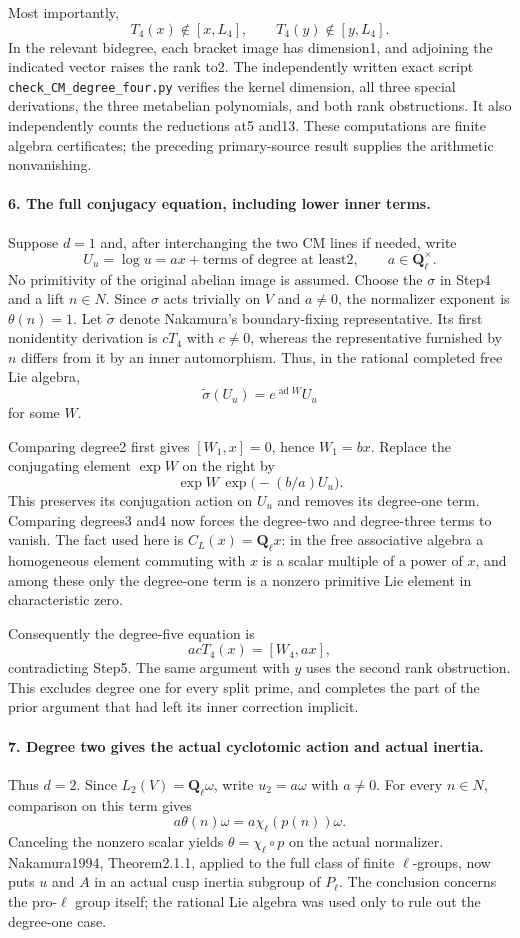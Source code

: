Most importantly,
\[
 T_4(x)\notin[x,L_4],\qquad T_4(y)\notin[y,L_4].
\]
In the relevant bidegree, each bracket image has dimension1, and adjoining the indicated vector raises the rank to2. The independently written exact script \texttt{check\_CM\_degree\_four.py} verifies the kernel dimension, all three special derivations, the three metabelian polynomials, and both rank obstructions. It also independently counts the reductions at5 and13. These computations are finite algebra certificates; the preceding primary-source result supplies the arithmetic nonvanishing.

\paragraph{6. The full conjugacy equation, including lower inner terms.}
Suppose $d=1$ and, after interchanging the two CM lines if needed, write
\[
 U_u=\log u=a x+\text{terms of degree at least2},\qquad a\in\mathbf Q_\ell^\times.
\]
No primitivity of the original abelian image is assumed. Choose the $\sigma$ in Step4 and a lift $n\in N$. Since $\sigma$ acts trivially on $V$ and $a\ne0$, the normalizer exponent is $\theta(n)=1$. Let $\widetilde\sigma$ denote Nakamura's boundary-fixing representative. Its first nonidentity derivation is $cT_4$ with $c\ne0$, whereas the representative furnished by $n$ differs from it by an inner automorphism. Thus, in the rational completed free Lie algebra,
\[
 \widetilde\sigma(U_u)=e^{\operatorname{ad} W}U_u
\]
for some $W$.

Comparing degree2 first gives $[W_1,x]=0$, hence $W_1=b x$. Replace the conjugating element $\exp W$ on the right by
\[
 \exp W\,\exp\bigl(-(b/a)U_u\bigr).
\]
This preserves its conjugation action on $U_u$ and removes its degree-one term. Comparing degrees3 and4 now forces the degree-two and degree-three terms to vanish. The fact used here is $C_L(x)=\mathbf Q_\ell x$: in the free associative algebra a homogeneous element commuting with $x$ is a scalar multiple of a power of $x$, and among these only the degree-one term is a nonzero primitive Lie element in characteristic zero.

Consequently the degree-five equation is
\[
 acT_4(x)=[W_4,a x],
\]
contradicting Step5. The same argument with $y$ uses the second rank obstruction. This excludes degree one for every split prime, and completes the part of the prior argument that had left its inner correction implicit.

\paragraph{7. Degree two gives the actual cyclotomic action and actual inertia.}
Thus $d=2$. Since $L_2(V)=\mathbf Q_\ell\omega$, write $u_2=a\omega$ with $a\ne0$. For every $n\in N$, comparison on this term gives
\[
 a\theta(n)\omega=a\chi_\ell(p(n))\omega.
\]
Canceling the nonzero scalar yields $\theta=\chi_\ell\circ p$ on the actual normalizer. Nakamura1994, Theorem2.1.1, applied to the full class of finite $\ell$-groups, now puts $u$ and $A$ in an actual cusp inertia subgroup of $P_\ell$. The conclusion concerns the pro-$\ell$ group itself; the rational Lie algebra was used only to rule out the degree-one case.

